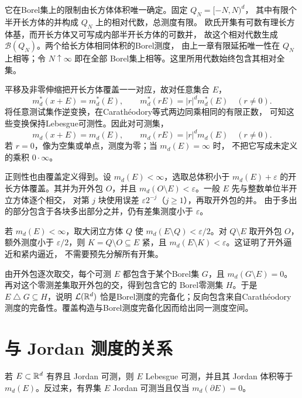 它在Borel集上的限制由长方体体积唯一确定。固定 $Q_N=[-N,N)^d$，
其中有限个半开长方体的并构成 $Q_N$ 上的相对代数，总测度有限。
欧氏开集有可数有理长方体基，而开长方体又可写成内部半开长方体的可数并，
故这个相对代数生成 $\mathcal B(Q_N)$。两个给长方体相同体积的Borel测度，
由上一章有限延拓唯一性在 $Q_N$ 上相等；令 $N\uparrow\infty$ 即在全部
Borel集上相等。这里所用代数始终包含其相对全集。

平移及非零伸缩把开长方体覆盖一一对应，故对任意集合 $E$，
\[
 m_d^*(x+E)=m_d^*(E),\qquad
 m_d^*(rE)=|r|^d m_d^*(E)\quad(r\ne0).
\]
将任意测试集作逆变换，在Carathéodory等式两边同乘相同的有限正数，
可知这些变换保持Lebesgue可测性。因此对可测集，
\[
 m_d(x+E)=m_d(E),\qquad m_d(rE)=|r|^d m_d(E)\quad(r\ne0).
\]
若 $r=0$，像为空集或单点，测度为零；当 $m_d(E)=\infty$ 时，
不把它写成未定义的乘积 $0\cdot\infty$。

正则性也由覆盖定义得到。设 $m_d(E)<\infty$，选取总体积小于
$m_d(E)+\varepsilon$ 的开长方体覆盖。其并为开外包 $O$，并且
$m_d(O\setminus E)<\varepsilon$。一般 $E$ 先与整数单位半开立方体逐个相交，
对第 $j$ 块使用误差 $\varepsilon2^{-j}$（$j\ge1$），再取开外包的并。
由于多出的部分包含于各块多出部分之并，仍有差集测度小于 $\varepsilon$。

若 $m_d(E)<\infty$，取大闭立方体 $Q$ 使
$m_d(E\setminus Q)<\varepsilon/2$。对 $Q\setminus E$ 取开外包 $O$，
额外测度小于 $\varepsilon/2$，则 $K=Q\setminus O\subseteq E$ 紧，且
$m_d(E\setminus K)<\varepsilon$。这证明了开外逼近和紧内逼近，
不需要预先分解所有开集。

由开外包逐次取交，每个可测 $E$ 都包含于某个Borel集 $G$，且
$m_d(G\setminus E)=0$。再对这个零测差集取开外包的交，得到包含它的
Borel零测集 $H$。于是 $E\mathbin\triangle G\subseteq H$，说明
$\mathcal L(\mathbb{R}^d)$ 恰是Borel测度的完备化；反向包含来自Carathéodory
测度的完备性。覆盖构造与Borel测度完备化因而给出同一测度空间。

\section{与 Jordan 测度的关系}

\begin{theorem}
\label{thm:jordan-lebesgue-comparison}
若 $E\subset\mathbb{R}^d$ 有界且 Jordan 可测，则 $E$ Lebesgue 可测，并且其
Jordan 体积等于 $m_d(E)$。反过来，有界集 $E$ Jordan 可测当且仅当
$m_d(\partial E)=0$。
\end{theorem}

